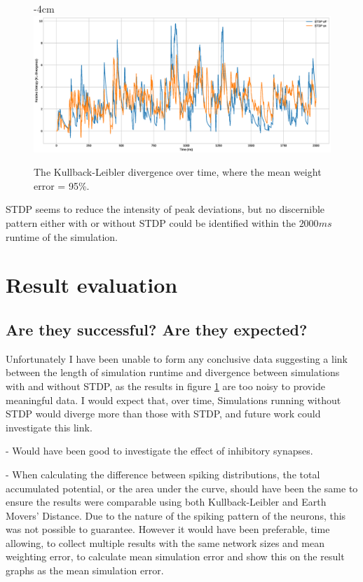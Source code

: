 \begin{figure}[h!]
    \centering
    \addtolength{\leftskip} {-4cm}
    \addtolength{\rightskip}{-4cm}
    \includegraphics[width=1.6\linewidth]{figures/graphs/RESULT2.eps}
    \caption[KL divergence over time, mean weight error = 95\%]{The Kullback-Leibler divergence over time, where the mean weight error = 95\%.}
    \label{fig:RES2}
\end{figure}
\FloatBarrier
STDP seems to reduce the intensity of peak deviations, but no discernible pattern either with or without STDP could be identified within the $2000ms$ runtime of the simulation.


\section{Result evaluation}

\subsection{Are they successful? Are they expected?}

Unfortunately I have been unable to form any conclusive data suggesting a link
between the length of simulation runtime and divergence between simulations with
and without STDP, as the results in figure \ref{fig:RES2} are too noisy to
provide meaningful data. I would expect that, over time, Simulations running
without STDP would diverge more than those with STDP, and future work could
investigate this link.

- Would have been good to investigate the effect of inhibitory synapses.

- When calculating the difference between spiking distributions, the total
accumulated potential, or the area under
the curve, should have been the same to ensure
the results were comparable using both Kullback-Leibler and Earth Movers'
Distance. Due to the nature of the spiking pattern of the neurons, this was not
possible to guarantee. However it would have been preferable, time allowing, to
collect multiple results with the same network sizes and mean weighting error,
to calculate mean simulation error and show this on the result graphs as the
mean simulation error.

